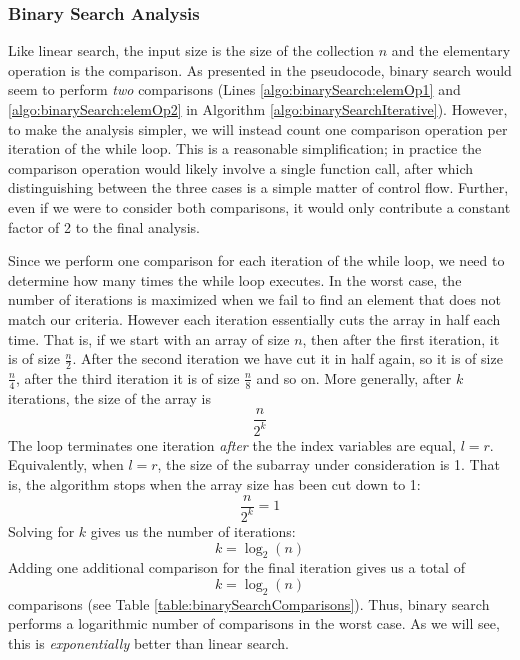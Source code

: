 \subsubsection{Binary Search Analysis}

Like linear search, the input size is the size of the collection $n$ and the
elementary operation is the comparison.  As presented in the pseudocode, 
binary search would seem to perform \emph{two} comparisons (Lines
\ref{algo:binarySearch:elemOp1} and \ref{algo:binarySearch:elemOp2} in Algorithm
\ref{algo:binarySearchIterative}).  However, to make the analysis simpler, we
will instead count one comparison operation per iteration of the 
while loop.  This is a reasonable simplification; in practice the comparison
operation would likely involve a single function call, after which 
distinguishing between the three cases is a simple matter of control flow.
Further, even if we were to consider both comparisons, it would only contribute
a constant factor of 2 to the final analysis.

Since we perform one comparison for each iteration of the while loop, we need
to determine how many times the while loop executes.  In the worst case, the
number of iterations is maximized when we fail to find an element that does
not match our criteria.  However each iteration essentially cuts the array in
half each time.  That is, if we start with an array of size $n$, then after the 
first iteration, it is of size $\frac{n}{2}$.  After the second iteration
we have cut it in half again, so it is of size $\frac{n}{4}$, after the third
iteration it is of size $\frac{n}{8}$ and so on.  More generally, after
$k$ iterations, the size of the array is
  $$\frac{n}{2^k}$$
The loop terminates one iteration \emph{after} the the index variables are 
equal, $l = r$.  Equivalently, when $l = r$, the size of the subarray under consideration is 1.  That is, the algorithm stops when the array size has
been cut down to 1:
  $$\frac{n}{2^k} = 1$$
Solving for $k$ gives us the number of iterations:
  $$k = \log_2{(n)}$$
Adding one additional comparison for the final iteration gives us a
total of 
  $$k = \log_2{(n)}$$
comparisons (see Table \ref{table:binarySearchComparisons}).  Thus, binary search performs a logarithmic number of 
comparisons in the worst
case.  As we will see, this is \emph{exponentially} better than linear search.


